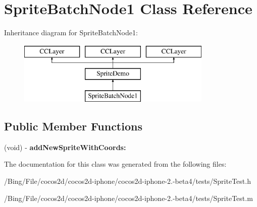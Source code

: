 \hypertarget{interface_sprite_batch_node1}{\section{Sprite\-Batch\-Node1 Class Reference}
\label{interface_sprite_batch_node1}
}
Inheritance diagram for Sprite\-Batch\-Node1\-:\begin{figure}[H]
\begin{center}
\leavevmode
\includegraphics[height=3.000000cm]{interface_sprite_batch_node1}
\end{center}
\end{figure}
\subsection*{Public Member Functions}
\begin{DoxyCompactItemize}
\item 
\hypertarget{interface_sprite_batch_node1_ae742b11f9015a0fad66bf3a53bf5f806}{(void) -\/ {\bfseries add\-New\-Sprite\-With\-Coords\-:}}\label{interface_sprite_batch_node1_ae742b11f9015a0fad66bf3a53bf5f806}

\end{DoxyCompactItemize}


The documentation for this class was generated from the following files\-:\begin{DoxyCompactItemize}
\item 
/\-Bing/\-File/cocos2d/cocos2d-\/iphone/cocos2d-\/iphone-\/2.-\/beta4/tests/Sprite\-Test.\-h\item 
/\-Bing/\-File/cocos2d/cocos2d-\/iphone/cocos2d-\/iphone-\/2.-\/beta4/tests/Sprite\-Test.\-m\end{DoxyCompactItemize}
